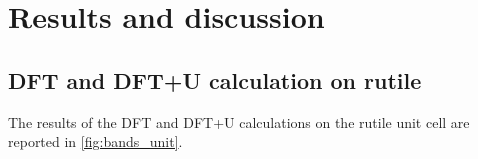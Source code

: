 \section{Results and discussion}

\subsection{DFT and DFT+U calculation on rutile}
The results of the DFT and DFT+U calculations on the rutile unit cell are reported in \cref{fig:bands_unit}.
